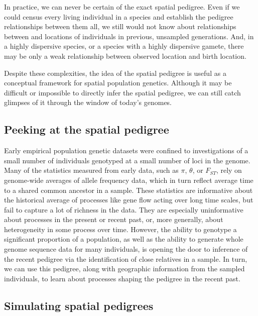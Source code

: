 \documentclass{ar-1col}
\begin{document}
In practice, we can never be certain of the exact spatial pedigree.
Even if we could census every living individual in a species
and establish the pedigree relationships between them all,
we still would not know about relationships between
and locations of individuals in previous, unsampled generations.
And, in a highly dispersive species,
or a species with a highly dispersive gamete,
there may be only a weak relationship between observed location and birth location.

Despite these complexities,
the idea of the spatial pedigree is useful
as a conceptual framework for spatial population genetics.
Although it may be difficult or impossible
to directly infer the spatial pedigree,
we can still catch glimpses of it through the window of today's genomes.

\subsection{Peeking at the spatial pedigree}
Early empirical population genetic datasets were confined to 
investigations of a small number of individuals 
genotyped at a small number of loci in the genome.
Many of the statistics measured from early data, 
such as $\pi$, $\theta$, or $F_{ST}$,
rely on genome-wide averages of allele frequency data, 
which in turn reflect average time to a shared common ancestor in a sample.
These statistics are informative about 
the historical average of processes like gene flow acting over long time scales, 
but fail to capture a lot of richness in the data. 
They are especially uninformative about processes in the present or recent past, 
or, more generally, about heterogeneity in some process over time.
However, the ability to genotype a significant proportion of a population, 
as well as the ability to generate whole genome sequence data for many individuals, 
is opening the door to inference of the recent pedigree 
via the identification of close relatives in a sample.
In turn, we can use this pedigree, 
along with geographic information from the sampled individuals, 
to learn about processes shaping the pedigree in the recent past.

\subsection{Simulating spatial pedigrees}
\end{document}
